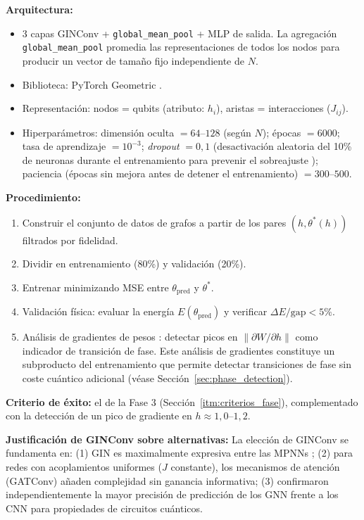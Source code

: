 \documentclass[11pt,a4paper,spanish]{book}
\begin{document}
\textbf{Arquitectura:}
\begin{itemize}
    \item 3 capas GINConv \citep{xu2019} + \texttt{global\_mean\_pool} + MLP de salida. La agregación \texttt{global\_mean\_pool} promedia las representaciones de todos los nodos para producir un vector de tamaño fijo independiente de $N$.
    \item Biblioteca: PyTorch Geometric \citep{fey2019}.
    \item Representación: nodos = qubits (atributo: $h_i$), aristas = interacciones ($J_{ij}$).
    \item Hiperparámetros: dimensión oculta $= 64$--$128$ (según $N$); épocas $= 6000$; tasa de aprendizaje $= 10^{-3}$; \emph{dropout} $= 0,1$ (desactivación aleatoria del 10\% de neuronas durante el entrenamiento para prevenir el sobreajuste \citep{gal2016}); paciencia (épocas sin mejora antes de detener el entrenamiento) $= 300$--$500$.
\end{itemize}

\textbf{Procedimiento:}
\begin{enumerate}
    \item Construir el conjunto de datos de grafos a partir de los pares $(h, \theta^*(h))$ filtrados por fidelidad.
    \item Dividir en entrenamiento (80\%) y validación (20\%).
    \item Entrenar minimizando MSE entre $\theta_{\text{pred}}$ y $\theta^*$.
    \item Validación física: evaluar la energía $E(\theta_{\text{pred}})$ y verificar $\Delta E/\text{gap} < 5\%$.
    \item Análisis de gradientes de pesos \citep{hernandes2025}: detectar picos en $\|\partial W / \partial h\|$ como indicador de transición de fase. Este análisis de gradientes constituye un subproducto del entrenamiento que permite detectar transiciones de fase sin coste cuántico adicional (véase Sección~\ref{sec:phase_detection}).
\end{enumerate}

\textbf{Criterio de éxito:} el de la Fase 3 (Sección~\ref{itm:criterios_fase}), complementado con la detección de un pico de gradiente en $h \approx 1,0$--$1,2$.

\textbf{Justificación de GINConv sobre alternativas:} La elección de GINConv se fundamenta en: (1) GIN es maximalmente expresiva entre las MPNNs \citep{xu2019}; (2) para redes con acoplamientos uniformes ($J$ constante), los mecanismos de atención (GATConv) añaden complejidad sin ganancia informativa; (3) \citet{meng2025} confirmaron independientemente la mayor precisión de predicción de los GNN frente a los CNN para propiedades de circuitos cuánticos.
\end{document}

